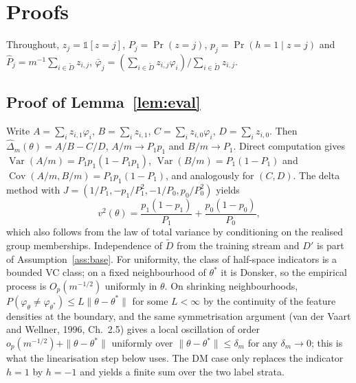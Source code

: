 \documentclass[10pt,twocolumn]{article}
\newcommand{\dhat}{\hat\Delta}
\newcommand{\Dp}{D'}
\newcommand{\Dt}{\tilde D}
\begin{document}
\appendix
\section{Proofs}
\label{app:proofs}

Throughout, $z_j=\mathbb{1}[z=j]$, $P_j=\Pr(z=j)$, $p_j=\Pr(h=1\mid z=j)$ and
$\hat P_j=m^{-1}\sum_{i\in\Dt}z_{i,j}$, $\bar\varphi_j=(\sum_{i\in\Dt}z_{i,j}\varphi_i)/\sum_{i\in\Dt}z_{i,j}$.

\subsection{Proof of Lemma~\ref{lem:eval}}
Write $A=\sum_{i}z_{i,1}\varphi_i$, $B=\sum_i z_{i,1}$, $C=\sum_i z_{i,0}\varphi_i$, $D=\sum_i z_{i,0}$.
Then $\dhat_m(\theta)=A/B-C/D$, $A/m\to P_1p_1$ and $B/m\to P_1$.  Direct computation gives
$\operatorname{Var}(A/m)=P_1p_1(1-P_1p_1)$, $\operatorname{Var}(B/m)=P_1(1-P_1)$ and
$\operatorname{Cov}(A/m,B/m)=P_1p_1(1-P_1)$, and analogously for $(C,D)$.  The delta method with
$J=(1/P_1,-p_1/P_1^2,-1/P_0,p_0/P_0^2)$ yields
\[
v^2(\theta)=\frac{p_1(1-p_1)}{P_1}+\frac{p_0(1-p_0)}{P_0},
\]
which also follows from the law of total variance by conditioning on the realised group memberships.
Independence of $\Dt$ from the training stream and $\Dp$ is part of Assumption~\ref{ass:base}.
For uniformity, the class of half-space indicators is a bounded VC class; on a fixed neighbourhood
of $\theta^*$ it is Donsker, so the empirical process is $O_p(m^{-1/2})$ uniformly in $\theta$.  On
shrinking neighbourhoods, $P(\varphi_\theta\neq\varphi_{\theta^*})\le L\|\theta-\theta^*\|$ for some
$L<\infty$ by the continuity of the feature densities at the boundary, and the same symmetrisation
argument (van der Vaart and Wellner, 1996, Ch.~2.5) gives a local oscillation of order
$o_p(m^{-1/2})+\|\theta-\theta^*\|$ uniformly over $\|\theta-\theta^*\|\le\delta_m$ for any
$\delta_m\to0$; this is what the linearisation step below uses.  The DM case only replaces the
indicator $h=1$ by $h=-1$ and yields a finite sum over the two label strata.
\end{document}
